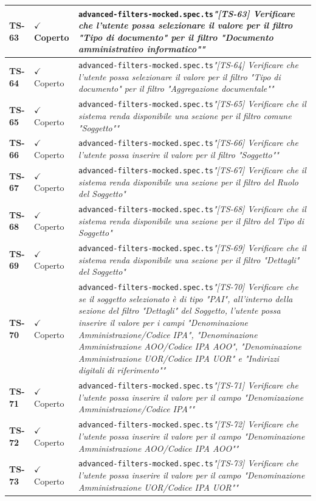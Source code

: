 \documentclass[a4paper,12pt]{article}
\newcommand{\ok}{\textcolor{green!60!black}{$\checkmark$ Coperto}}
\newcommand{\f}[1]{\nolinkurl{#1}\newline}
\newcommand{\q}[1]{\textit{#1}}
\begin{document}
\begin{longtable}{|p{1.5cm}|p{3.0cm}|p{10.5cm}|}
\textbf{TS-63} & \ok & \f{advanced-filters-mocked.spec.ts}\q{"[TS-63] Verificare che l'utente possa selezionare il valore per il filtro "Tipo di documento" per il filtro "Documento amministrativo informatico""} \\ \hline
\textbf{TS-64} & \ok & \f{advanced-filters-mocked.spec.ts}\q{"[TS-64] Verificare che l'utente possa selezionare il valore per il filtro "Tipo di documento" per il filtro "Aggregazione documentale""} \\ \hline
\textbf{TS-65} & \ok & \f{advanced-filters-mocked.spec.ts}\q{"[TS-65] Verificare che il sistema renda disponibile una sezione per il filtro comune "Soggetto""} \\ \hline
\textbf{TS-66} & \ok & \f{advanced-filters-mocked.spec.ts}\q{"[TS-66] Verificare che l'utente possa inserire il valore per il filtro "Soggetto""} \\ \hline
\textbf{TS-67} & \ok & \f{advanced-filters-mocked.spec.ts}\q{"[TS-67] Verificare che il sistema renda disponibile una sezione per il filtro del Ruolo del Soggetto"} \\ \hline
\textbf{TS-68} & \ok & \f{advanced-filters-mocked.spec.ts}\q{"[TS-68] Verificare che il sistema renda disponibile una sezione per il filtro del Tipo di Soggetto"} \\ \hline
\textbf{TS-69} & \ok & \f{advanced-filters-mocked.spec.ts}\q{"[TS-69] Verificare che il sistema renda disponibile una sezione per il filtro "Dettagli" del Soggetto"} \\ \hline
\textbf{TS-70} & \ok & \f{advanced-filters-mocked.spec.ts}\q{"[TS-70] Verificare che se il soggetto selezionato è di tipo "PAI", all'interno della sezione del filtro "Dettagli" del Soggetto, l'utente possa inserire il valore per i campi "Denominazione Amministrazione/Codice IPA", "Denominazione Amministrazione AOO/Codice IPA AOO", "Denominazione Amministrazione UOR/Codice IPA UOR" e "Indirizzi digitali di riferimento""} \\ \hline
\textbf{TS-71} & \ok & \f{advanced-filters-mocked.spec.ts}\q{"[TS-71] Verificare che l'utente possa inserire il valore per il campo "Denomizazione Amministrazione/Codice IPA""} \\ \hline
\textbf{TS-72} & \ok & \f{advanced-filters-mocked.spec.ts}\q{"[TS-72] Verificare che l'utente possa inserire il valore per il campo "Denominazione Amministrazione AOO/Codice IPA AOO""} \\ \hline
\textbf{TS-73} & \ok & \f{advanced-filters-mocked.spec.ts}\q{"[TS-73] Verificare che l'utente possa inserire il valore per il campo "Denominazione Amministrazione UOR/Codice IPA UOR""} \\ \hline

\end{longtable}
\end{document}
